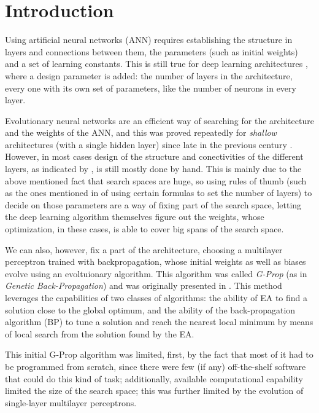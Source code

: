 \documentclass[runningheads]{llncs}
\begin{document}
\section{Introduction}

Using artificial neural networks (ANN) requires establishing the
structure in layers and connections between them, the parameters (such
as initial weights) and a set of learning constants. This is still
true for deep learning architectures \cite{goodfellow,nielsen}, where
a design parameter is added: the number of layers in the architecture,
every one with its own set of parameters, like the number of neurons
in every layer.

Evolutionary neural networks are an efficient way of searching for the
architecture and the weights of the ANN, and this was proved
repeatedly for {\em shallow} architectures (with a single hidden
layer) since late in the previous century
\cite{CastilloNPL,stanley2002evolving}. However, in most cases design
of the structure and conectivities of the different layers, as
indicated by \cite{miikkulainen2019evolving}, is still mostly done by
hand. This is mainly due to the above mentioned fact that search
spaces are huge, so using rules of thumb (such as the ones mentioned
in \cite{qolomany2017parameters} of using certain formulas to set the
number of layers) to decide on those parameters
are a way of fixing part of the search space, letting the deep
learning algorithm themselves figure out the weights, whose
optimization, in these cases, is able to cover big spans of the search
space.

We can also, however, fix a part of the architecture, choosing a
multilayer perceptron trained with backpropagation, whose initial
weights as well as biases evolve using an evoltuionary algorithm. This
algorithm was called \emph{G-Prop} (as in \emph{Genetic Back-Propagation})
and was originally presented in \cite{castilloNC,CastilloNPL}. This
method leverages the capabilities of two classes of algorithms: the
ability of EA to find a solution close to the global optimum, and the
ability of the back-propagation algorithm (BP) to tune a solution and
reach the nearest local minimum by means of local search from the
solution found by the EA.

This initial G-Prop algorithm was limited, first, by the fact that
most of it had to be programmed from scratch, since there were few (if
any) off-the-shelf software that could do this kind of task; 
additionally, available computational capability limited the size of
the search space; 
this was further limited by the evolution of single-layer multilayer perceptrons. 
\end{document}

